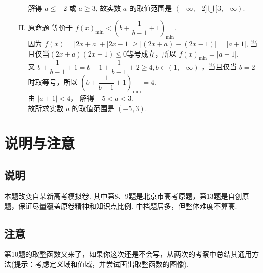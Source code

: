 \documentclass[11pt]{article}
\begin{document}
\begin{enumerate}
\begin{enumerate}[(I)]
		\\解得 $a \leq-2$ 或 $a \geq 3 $,
		故实数 $a$ 的取值范围是 $(-\infty,-2] \bigcup [3,+\infty)$.
		\item 
		原命题
		等价于 $f(x)_{\min }<\left(b+\dfrac{1}{b-1}+1\right)_{\min } .$
		\\因为 $f(x)=|2 x+a|+|2 x-1| \geqslant |(2x+a)-(2x-1)|=|a+1|$, 当且仅当$ (2x+a)(2x-1)\leqslant 0 $等号成立，所以 $f(x)_{\min }=|a+1| .$
		\\又 $b+\dfrac{1}{b-1}+1=b-1+\dfrac{1}{b-1}+2 \geqslant 4 ,b \in(1,+\infty)$ ，当且仅当 $b=2$ 时取等号，所以 $\left(b+\dfrac{1}{b-1}+1\right)_{\min }=4 .$
		\\由 $|a+1|<4 ，$ 解得 $-5<a<3 $.
		\\故所求实数 $a$ 的取值范围是 $(-5,3) .$
	\end{enumerate}
\end{enumerate}
\section{\heiti 说明与注意}
\subsection{\heiti 说明}
	本题改变自某新高考模拟卷. 其中第8、9题是北京市高考原题，第13题是自创原题，保证尽量覆盖原卷精神和知识点比例. 中档题居多，但整体难度不算高. 
\subsection{\heiti 注意}
	第10题的取整函数又来了，如果你这次还是不会写，从两次的考察中总结其通用方法(提示：考虑定义域和值域，并尝试画出取整函数的图像).
\end{document}
